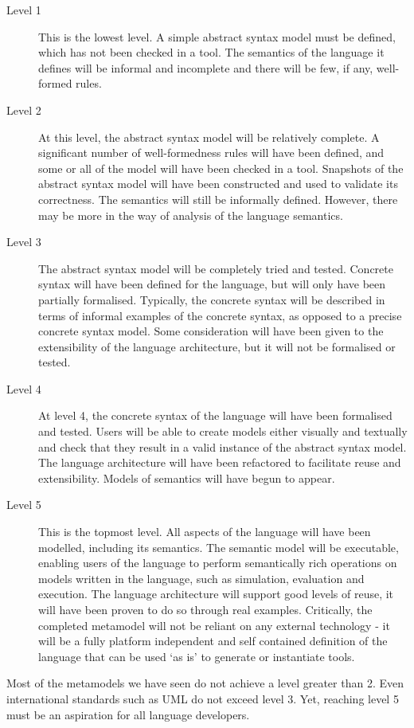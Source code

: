 \begin{description}
\item [Level 1] This is the lowest level. A simple abstract syntax
model must be defined, which has not been checked in a tool. The
semantics of the language it defines will be informal and
incomplete and there will be few, if any, well-formed rules.
\item [Level 2] At this level, the abstract syntax model will
be relatively complete. A significant number of well-formedness
rules will have been defined, and some or all of the model will
have been checked in a tool. Snapshots of the abstract syntax
model will have been constructed and used to validate its
correctness. The semantics will still be informally defined.
However, there may be more in the way of analysis of the language
semantics.
\item [Level 3] The abstract syntax model will be completely tried
and tested. Concrete syntax will have been defined for the
language, but will only have been partially formalised. Typically,
the concrete syntax will be described in terms of informal
examples of the concrete syntax, as opposed to a precise concrete
syntax model. Some consideration will have been given to the
extensibility of the language architecture, but it will not be
formalised or tested.
\item [Level 4] At level 4, the concrete syntax of the language
will have been formalised and tested. Users will be able to create
models either visually and textually and check that they result in
a valid instance of the abstract syntax model. The language
architecture will have been refactored to facilitate reuse and
extensibility. Models of semantics will have begun to appear.
\item [Level 5] This is the topmost level. All aspects of the
language will have been modelled, including its semantics. The
semantic model will be executable, enabling users of the language
to perform semantically rich operations on models written in the
language, such as simulation, evaluation and execution. The
language architecture will support good levels of reuse, it will
have been proven to do so through real examples. Critically, the
completed metamodel will not be reliant on any external technology
- it will be a fully platform independent and self contained
definition of the language that can be used `as is' to generate or
instantiate tools.
\end{description}

Most of the metamodels we have seen do not achieve a level greater
than 2. Even international standards such as UML do not exceed
level 3. Yet, reaching level 5 must be an aspiration for all
language developers.

